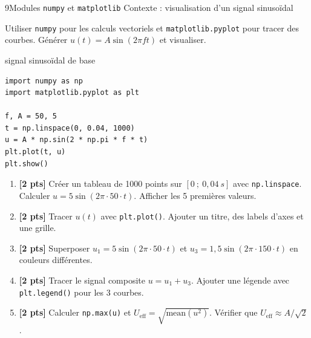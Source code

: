 \documentclass[10pt,a4paper]{article}
\begin{document}
\clearpage
\begin{tptitre}{9}{Modules \texttt{numpy} et \texttt{matplotlib}}
  Contexte : visualisation d'un signal sinusoïdal
\end{tptitre}

\begin{objectifbox}
  Utiliser \texttt{numpy} pour les calculs vectoriels et \texttt{matplotlib.pyplot} pour tracer des courbes. Générer $u(t) = A\sin(2\pi f t)$ et visualiser.
\end{objectifbox}

\begin{codebox}{signal sinusoïdal de base}
\begin{lstlisting}
import numpy as np
import matplotlib.pyplot as plt

f, A = 50, 5
t = np.linspace(0, 0.04, 1000)
u = A * np.sin(2 * np.pi * f * t)
plt.plot(t, u)
plt.show()
\end{lstlisting}
\end{codebox}

\begin{enumerate}[leftmargin=*, label=\textbf{Q\arabic*.}]
  \item \textbf{[2 pts]} Créer un tableau de 1000 points sur $[0\ ;\ 0{,}04\ s]$ avec \texttt{np.linspace}. Calculer $u = 5\sin(2\pi \cdot 50 \cdot t)$. Afficher les 5 premières valeurs.
  \item \textbf{[2 pts]} Tracer $u(t)$ avec \texttt{plt.plot()}. Ajouter un titre, des labels d'axes et une grille.
  \item \textbf{[2 pts]} Superposer $u_1 = 5\sin(2\pi \cdot 50 \cdot t)$ et $u_3 = 1{,}5\sin(2\pi \cdot 150 \cdot t)$ en couleurs différentes.
  \item \textbf{[2 pts]} Tracer le signal composite $u = u_1 + u_3$. Ajouter une légende avec \texttt{plt.legend()} pour les 3 courbes.
  \item \textbf{[2 pts]} Calculer \texttt{np.max(u)} et $U_\mathrm{eff} = \sqrt{\mathrm{mean}(u^2)}$. Vérifier que $U_\mathrm{eff} \approx A/\sqrt{2}$.
\end{enumerate}
\end{document}
